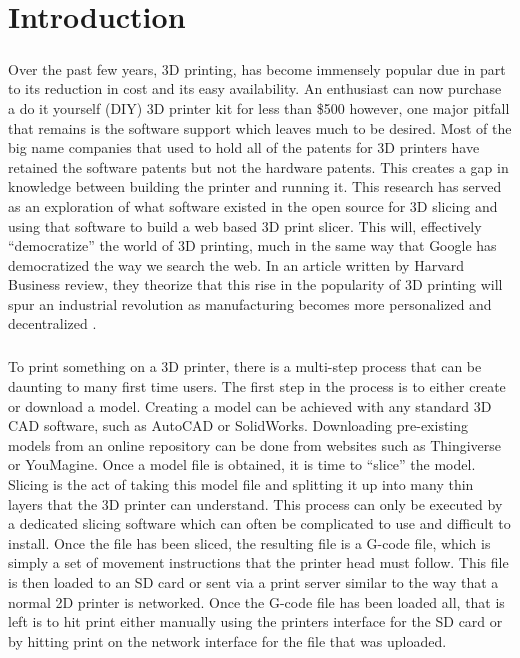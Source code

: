 \chapter{Introduction}
\paragraph{}
\citep{reprap-2011}
Over the past few years, 3D printing, has become immensely popular due in part to its reduction in cost and its easy availability.
An enthusiast can now purchase a do it yourself (DIY) 3D printer kit for less than \$500 however, one major pitfall that remains is the software support which leaves much to be desired.
Most of the big name companies that used to hold all of the patents for 3D printers have retained the software patents but not the hardware patents. 
This creates a gap in knowledge between building the printer and running it.
This research has served as an exploration of what software existed in the open source for 3D slicing and using that software to build a web based 3D print slicer.
This will, effectively “democratize” the world of 3D printing, much in the same way that Google has democratized the way we search the web. 
In an article written by Harvard Business review, they theorize that this rise in the popularity of 3D printing will spur an industrial revolution as manufacturing becomes more personalized and decentralized \citep{daveni-2015}.

\paragraph{}
To print something on a 3D printer, there is a multi-step process that can be daunting to many first time users. 
The first step in the process is to either create or download a model.
Creating a model can be achieved with any standard 3D CAD software, such as AutoCAD or SolidWorks.
Downloading pre-existing models from an online repository can be done from websites such as Thingiverse or YouMagine.
Once a model file is obtained, it is time to “slice” the model.
Slicing is the act of taking this model file and splitting it up into many thin layers that the 3D printer can understand.
This process can only be executed by a dedicated slicing software which can often be complicated to use and difficult to install.
Once the file has been sliced, the resulting file is a G-code file, which is simply a set of movement instructions that the printer head must follow.
This file is then loaded to an SD card or sent via a print server similar to the way that a normal 2D printer is networked.
Once the G-code file has been loaded all, that is left is to hit print either manually using the printers interface for the SD card or by hitting print on the network interface for the file that was uploaded.

